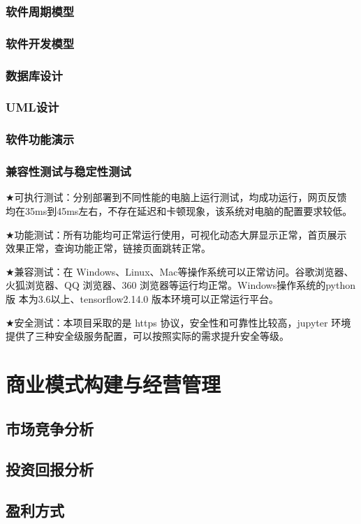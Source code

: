 \documentclass[withoutpreface,bwprint]{cumcmthesis} %
\begin{document}
	\subsubsection{ 软件周期模型}
	\subsubsection{ 软件开发模型}
	\subsubsection{ 数据库设计}
	\subsubsection{ UML设计}
	\subsubsection{ 软件功能演示}
	\subsubsection{ 兼容性测试与稳定性测试}
	$\bigstar$可执行测试：分别部署到不同性能的电脑上运行测试，均成功运行，网页反馈
	均在35ms到45ms左右，不存在延迟和卡顿现象，该系统对电脑的配置要求较低。\par
	$\bigstar$功能测试：所有功能均可正常运行使用，可视化动态大屏显示正常，首页展示
	效果正常，查询功能正常，链接页面跳转正常。\par
	$\bigstar$兼容测试：在 Windows、Linux、Mac等操作系统可以正常访问。谷歌浏览器、
	火狐浏览器、QQ 浏览器、360 浏览器等运行均正常。Windows操作系统的python版
	本为3.6以上、tensorflow2.14.0 版本环境可以正常运行平台。\par
	$\bigstar$安全测试：本项目采取的是 https 协议，安全性和可靠性比较高，jupyter 环境
	提供了三种安全级服务配置，可以按照实际的需求提升安全等级。\par
	\newpage
	\section{商业模式构建与经营管理}
	\subsection{市场竞争分析}
	\subsection{投资回报分析}
	\subsection{盈利方式}
\end{document}

